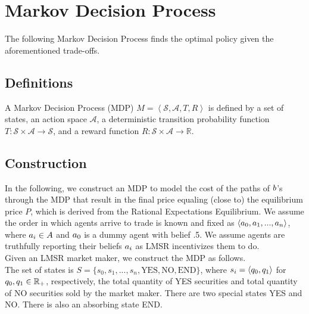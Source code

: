 \section{Markov Decision Process}
The following Markov Decision Process finds the optimal policy given the aforementioned trade-offs.

\subsection{Definitions}
A Markov Decision Process (MDP) $M=\left<\mathcal{S}, \mathcal{A}, T, R\right>$ is defined by a set of states, an action space $\mathcal{A}$, a deterministic transition probability function $T: \mathcal{S} \times \mathcal{A} \rightarrow \mathcal{S}$, and a reward function $R: \mathcal{S} \times \mathcal{A} \rightarrow \mathbb{R}$.\\

\subsection{Construction}
In the following, we construct an MDP to model the cost of the paths of $b$'s through the MDP that result in the final price equaling (close to) the equilibrium price $P$, which is derived from the Rational Expectations Equilibrium. We assume the order in which agents arrive to trade is known and fixed as $\left<a_0, a_1, ..., a_n\right>$, where $a_i \in A$ and $a_0$ is a dummy agent with belief .5. We assume agents are truthfully reporting their beliefs $a_i$ as LMSR incentivizes them to do.\\ 

Given an LMSR market maker, we construct the MDP as follows.\\


The set of states is $S = \{s_0, s_1, ..., s_n, \text{YES}, \text{NO}, \text{END}\}$, where $s_i= \left<{q_0}, {q_1}\right>$ for ${q_0}, {q_1} \in \mathbb{R}_+$, respectively, the total quantity of YES securities and total quantity of NO securities sold by the market maker. There are two special states YES and NO. There is also an absorbing state END. \\

